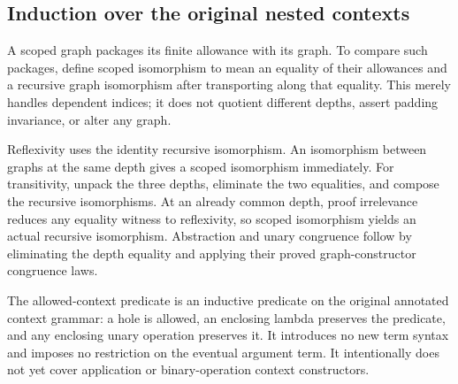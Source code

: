 







\subsection{Induction over the original nested contexts}


A scoped graph packages its finite allowance with its graph. To compare such
packages, define scoped isomorphism to mean an equality of their allowances
and a recursive graph isomorphism after transporting along that equality.
This merely handles dependent indices; it does not quotient different depths,
assert padding invariance, or alter any graph.

Reflexivity uses the identity recursive isomorphism. An isomorphism between
graphs at the same depth gives a scoped isomorphism immediately. For
transitivity, unpack the three depths, eliminate the two equalities, and
compose the recursive isomorphisms. At an already common depth, proof
irrelevance reduces any equality witness to reflexivity, so scoped
isomorphism yields an actual recursive isomorphism. Abstraction and unary
congruence follow by eliminating the depth equality and applying their
proved graph-constructor congruence laws.















The allowed-context predicate is an inductive predicate on the original
annotated context grammar: a hole is allowed, an enclosing lambda preserves
the predicate, and any enclosing unary operation preserves it. It introduces
no new term syntax and imposes no restriction on the eventual argument term.
It intentionally does not yet cover application or binary-operation context
constructors.

